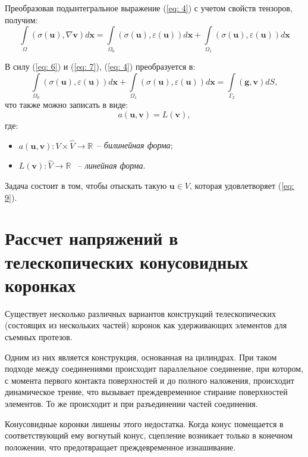 \documentclass[a4paper, 14pt]{extreport}
\begin{document}
Преобразовав подынтегральное выражение (\ref{eq: 4}) с учетом свойств тензоров, получим:
\begin{equation}
	\label{eq: 7}
	\int\limits_\Omega{(\sigma(\textbf{u}), \nabla \textbf{v})}d\textbf{x} = 
	\int\limits_{\Omega_0}{(\sigma(\textbf{u}), \varepsilon(\textbf{u}))}d\textbf{x} + 
	\int\limits_{\Omega_1}{(\sigma(\textbf{u}), \varepsilon(\textbf{u}))}d\textbf{x}
\end{equation}

В силу (\ref{eq: 6}) и (\ref{eq: 7}), (\ref{eq: 4}) преобразуется в:
\begin{equation}
	\label{eq: 8}
	\int\limits_{\Omega_0}{(\sigma(\textbf{u}), \varepsilon(\textbf{u}))}d\textbf{x} + 
	\int\limits_{\Omega_1}{(\sigma(\textbf{u}), \varepsilon(\textbf{u}))}d\textbf{x} = 
		\int\limits_{\Gamma_2}{(\textbf{g}, \textbf{v})}dS,
\end{equation}
что также можно записать в виде:
\begin{equation}
	\label{eq: 9}
	a(\textbf{u}, \textbf{v}) = L(\textbf{v}),
\end{equation}
где:
\begin{itemize}
	\item $a(\textbf{u}, \textbf{v}) : V \times \hat{V} \rightarrow \mathbb{R}$ \,-- \textit{билинейная форма};
	\item $L(\textbf{v}) : \hat{V} \rightarrow \mathbb{R}$ \, -- \textit{линейная форма}.
\end{itemize}

Задача состоит в том, чтобы отыскать такую  $\textbf{u} \in V$, 
которая удовлетворяет (\ref{eq: 9}).


\chapter{Рассчет напряжений в телескопических конусовидных коронках}
\label{ch:exp}

Существует несколько различных вариантов конструкций
телескопических (состоящих из нескольких частей) коронок 
как удерживающих элементов для съемных протезов.

Одним из них является конструкция, основанная на 
цилиндрах. При таком подходе между соединениями
происходит параллельное соединение, при котором, с момента 
первого контакта поверхностей и до полного наложения, 
происходит динамическое трение, что вызывает 
преждевременное стирание поверхностей элементов. То 
же происходит и при разъединении частей соединения.


Конусовидные коронки лишены этого недостатка.  Когда конус
помещается в соответствующий ему вогнутый конус, сцепление
возникает только в конечном положении, что предотвращает 
преждевременное изнашивание.
\end{document}
